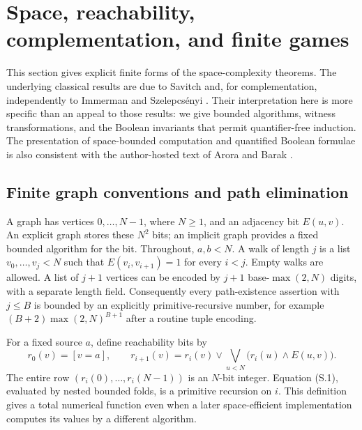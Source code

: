 \section{Space, reachability, complementation, and finite games}
\label{sec:space}

This section gives explicit finite forms of the space-complexity theorems.
The underlying classical results are due to Savitch and, for
complementation, independently to Immerman and Szelepcs\'enyi
\cite{Savitch1970,Immerman1988,Szelepcsenyi1988}.
Their interpretation here is more specific than an appeal to those results:
we give bounded algorithms, witness transformations, and the Boolean
invariants that permit quantifier-free induction.  The presentation of
space-bounded computation and quantified Boolean formulae is also consistent
with the author-hosted text of Arora and Barak \cite{AroraBarak}.

\subsection{Finite graph conventions and path elimination}

A graph has vertices $0,\ldots,N-1$, where $N\geq1$, and an adjacency bit
$E(u,v)$.  An explicit graph stores these $N^2$ bits; an implicit graph
provides a fixed bounded algorithm for the bit.  Throughout, $a,b<N$.
A walk of length $j$ is a list $v_0,\ldots,v_j<N$ such that
$E(v_i,v_{i+1})=1$ for every $i<j$.  Empty walks are allowed.  A list of
$j+1$ vertices can be encoded by $j+1$ base-$\max(2,N)$ digits, with a
separate length field.  Consequently every path-existence assertion with
$j\leq B$ is bounded by an explicitly primitive-recursive number, for
example $(B+2)\max(2,N)^{B+1}$ after a routine tuple encoding.

For a fixed source $a$, define reachability bits by
\[
 r_0(v)=[v=a],\qquad
 r_{i+1}(v)=r_i(v)\vee
       \bigvee_{u<N}\bigl(r_i(u)\wedge E(u,v)\bigr).
 \tag{S.1}
\]
The entire row $(r_i(0),\ldots,r_i(N-1))$ is an $N$-bit integer.
Equation (S.1), evaluated by nested bounded folds, is a primitive recursion
on $i$.  This definition gives a total numerical function even when a
later space-efficient implementation computes its values by a different
algorithm.

